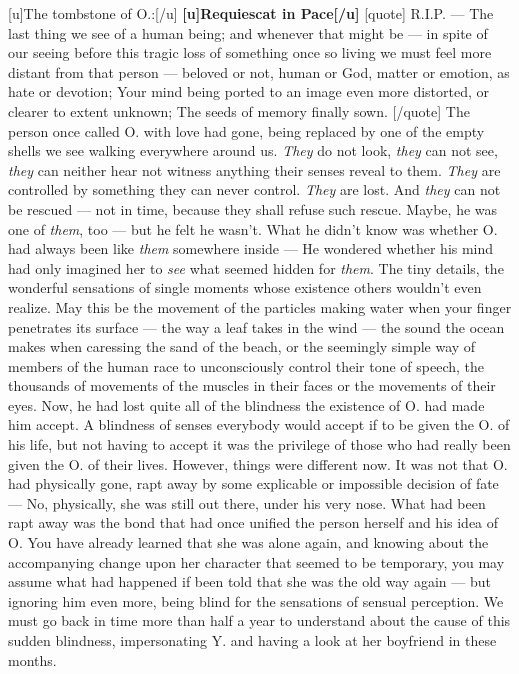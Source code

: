 [u]The tombstone of O.:[/u]
\textbf{[u]Requiescat in Pace[/u]}
[quote]
R.I.P. --- The last thing we see 
of a human being; 
and whenever that might be --- 
in spite of our seeing 
before this tragic loss 
of something once so living 
we must feel more distant 
from that person --- 
beloved or not, 
human or God, 
matter or emotion, 
as hate or devotion; 
Your mind being ported 
to an image even more distorted, 
or clearer to extent unknown; 
The seeds of memory 
finally sown. 
[/quote]
The person once called O. with love had gone, being replaced by one of the empty shells we see walking everywhere around us. \emph{They} do not look, \emph{they} can not see, \emph{they} can neither hear not witness anything their senses reveal to them. \emph{They} are controlled by something they can never control. 
\emph{They} are lost. 
And \emph{they} can not be rescued --- not in time, because they shall refuse such rescue. 
Maybe, he was one of \emph{them}, too --- but he felt he wasn't. What he didn't know was whether O. had always been like \emph{them} somewhere inside --- He wondered whether his mind had only imagined her to \emph{see} what seemed hidden for \emph{them}. The tiny details, the wonderful sensations of single moments whose existence others wouldn't even realize. 
May this be the movement of the particles making water when your finger penetrates its surface --- the way a leaf takes in the wind --- the sound the ocean makes when caressing the sand of the beach, or the seemingly simple way of members of the human race to unconsciously control their tone of speech, the thousands of movements of the muscles in their faces or the movements of their eyes. 
Now, he had lost quite all of the blindness the existence of O. had made him accept. A blindness of senses everybody would accept if to be given the O. of his life, but not having to accept it was the privilege of those who had really been given the O. of their lives. 
However, things were different now. It was not that O. had physically gone, rapt away by some explicable or impossible decision of fate --- No, physically, she was still out there, under his very nose. What had been rapt away was the bond that had once unified the person herself and his idea of O. 
You have already learned that she was alone again, and knowing about the accompanying change upon her character that seemed to be temporary, you may assume what had happened if been told that she was the old way again --- but ignoring him even more, being blind for the sensations of sensual perception. 
We must go back in time more than half a year to understand about the cause of this sudden blindness, impersonating Y. and having a look at her boyfriend in these months. 
